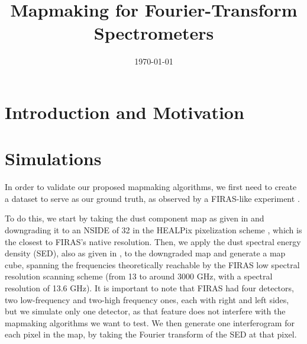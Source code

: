\documentclass{aa}
\def\Cosmoglobe{\textsc{Cosmoglobe}}
\begin{document}
 

   \title{Mapmaking for Fourier-Transform Spectrometers}

   

  

   \date{\today} 
   



   \maketitle

   

\section{Introduction and Motivation}
\label{sec:intro}

\section{Simulations}

In order to validate our proposed mapmaking algorithms, we first need to create a dataset to serve as our ground truth, as observed by a FIRAS-like experiment \citep{fixsen:1994,mather:1999}.

To do this, we start by taking the dust component map as given in \cite{planck2014-a12} and downgrading it to an NSIDE of 32 in the HEALPix pixelization scheme \citep{healpix}, which is the closest to FIRAS's native resolution. Then, we apply the dust spectral energy density (SED), also as given in \cite{planck2014-a12}, to the downgraded map and generate a map cube, spanning the frequencies theoretically reachable by the FIRAS low spectral resolution scanning scheme (from 13 to around 3000 GHz, with a spectral resolution of 13.6 GHz). It is important to note that FIRAS had four detectors, two low-frequency and two-high frequency ones, each with right and left sides, but we simulate only one detector, as that feature does not interfere with the mapmaking algorithms we want to test. We then generate one interferogram for each pixel in the map, by taking the Fourier transform of the SED at that pixel.
\end{document}
